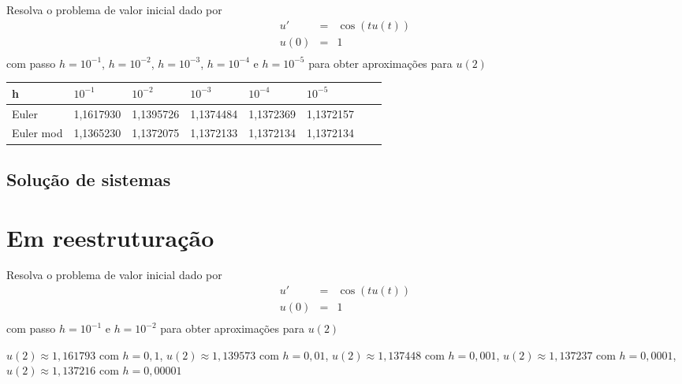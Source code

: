 \begin{exer}Resolva o problema de valor inicial dado por
\begin{eqnarray*}
u'&=& \cos(tu(t))\\
u(0)&=&1\\
\end{eqnarray*}
com passo $h=10^{-1}$, $h=10^{-2}$, $h=10^{-3}$, $h=10^{-4}$ e $h=10^{-5}$ para obter aproximações para $u(2)$
\end{exer}
\begin{resp}
\begin{center}
 \begin{tabular}{|l|l|l|l|l|l|l|l|}%
\hline
   h&$10^{-1}$&$10^{-2}$&$10^{-3}$&$10^{-4}$&$10^{-5}$\\
   \hline
   Euler & 1,1617930 & 1,1395726 & 1,1374484 & 1,1372369 & 1,1372157\\
   \hline
  Euler mod & 1,1365230 & 1,1372075 & 1,1372133 & 1,1372134 & 1,1372134\\
   \hline
   \end{tabular}
\end{center}
\end{resp}



\section{Solução de sistemas}

















\chapter{Em reestruturação}

\begin{exer}Resolva o problema de valor inicial dado por
\begin{eqnarray*}
u'&=& \cos(tu(t))\\
u(0)&=&1\\
\end{eqnarray*}
com passo $h=10^{-1}$ e $h=10^{-2}$ para obter aproximações para $u(2)$
\end{exer}
\begin{resp}
$u(2)\approx 1,161793$ com $h=0,1$,
$u(2)\approx 1,139573$ com $h=0,01$,
$u(2)\approx 1,137448$ com $h=0,001$,
$u(2)\approx 1,137237$ com $h=0,0001$,
$u(2)\approx 1,137216$ com $h=0,00001$
\end{resp}


